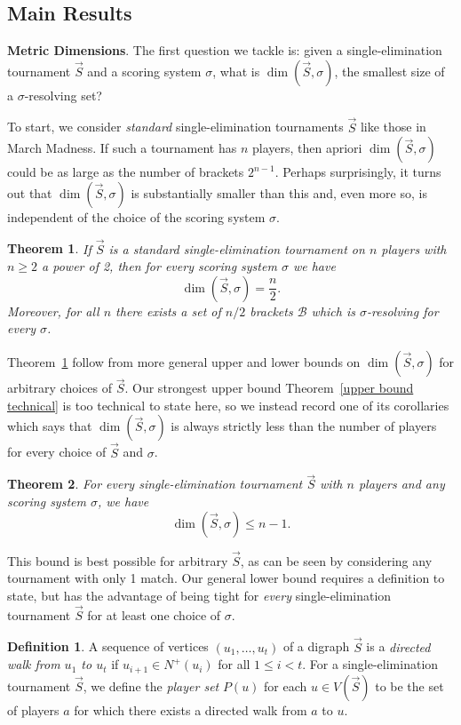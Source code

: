 \documentclass[12pt,letterpaper]{article}
\newtheorem{thm}{Theorem}[section]
\theoremstyle{definition}
\newtheorem{defn}{Definition}
\newcommand{\sig}{\sigma}
\renewcommand{\1}{\mathbbm{1}}
\renewcommand{\c}[1]{\mathcal{#1}}
\newcommand{\tour}{\vec{S}}
\begin{document}
\subsection{Main Results}
\textbf{Metric Dimensions}.  The first question we tackle is: given a single-elimination tournament $\tour$ and a scoring system $\sig$, what is $\dim(\tour,\sig)$, the smallest size of a $\sig$-resolving set?

To start, we consider \textit{standard} single-elimination tournaments $\tour$ like those in March Madness.  If such a tournament has $n$ players, then apriori $\dim(\tour,\sig)$ could be as large as the number of brackets $2^{n-1}$.  Perhaps surprisingly, it turns out that $\dim(\tour,\sig)$ is substantially smaller than this and, even more so, is independent of the choice of the scoring system $\sig$.

\begin{thm}\label{standard}
	If $\tour$ is a standard single-elimination tournament on $n$ players with $n\ge 2$ a power of 2, then for every scoring system $\sig$ we have
	\[\dim(\tour,\sig)=\frac{n}{2}.\]
	Moreover, for all $n$ there exists a set of $n/2$ brackets $\c{B}$ which is $\sig$-resolving for every $\sig$.
\end{thm}

Theorem~\ref{standard} follow from more general upper and lower bounds on $\dim(\tour,\sig)$ for arbitrary choices of $\tour$.  Our strongest upper bound Theorem~\ref{upper bound technical} is too technical to state here, so we instead record one of its corollaries which says that $\dim(\tour,\sig)$ is always strictly less than the number of players for every choice of $\tour$ and $\sig$.

\begin{thm}\label{upper bound}
	For every single-elimination tournament $\tour$ with $n$ players and any scoring system $\sig$, we have
	\[\dim(\tour,\sig)\le n-1.\]
\end{thm}

This bound is best possible for arbitrary $\tour$, as can be seen by considering any tournament with only 1 match.  Our general lower bound requires a definition to state, but has the advantage of being tight for \textit{every} single-elimination tournament $\tour$ for at least one choice of $\sig$.

\begin{defn}\label{Definition Pu}
	A sequence of vertices $(u_1,\ldots,u_t)$ of a digraph $\tour$ is a \textit{directed walk from $u_1$ to $u_t$} if $u_{i+1}\in N^+(u_i)$ for all $1\le i<t$.  For a single-elimination tournament $\tour$, we define the \textit{player set} $P(u)$ for each $u\in V(\tour)$ to be the set of players $a$ for which there exists a directed walk from $a$ to $u$.
\end{defn}
\end{document}
